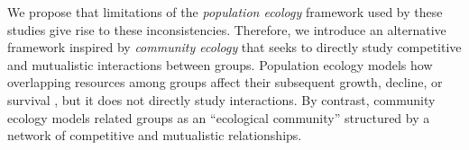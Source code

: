 \documentclass[letterpaper]{article}\usepackage[]{graphicx}\usepackage[]{color}
\begin{document}
We propose that limitations of the \emph{population ecology} framework used by these studies give rise to these inconsistencies. Therefore, we introduce an alternative framework inspired by \emph{community ecology} that seeks to directly study competitive and mutualistic interactions between groups.
Population ecology models how overlapping resources among groups affect their subsequent growth, decline, or survival \citep{freeman_community_2006, astley_two_1985}, but it does not directly study interactions. 
By contrast, community ecology models related groups as an ``ecological community''  structured by a network of competitive and mutualistic relationships.  










\end{document}
